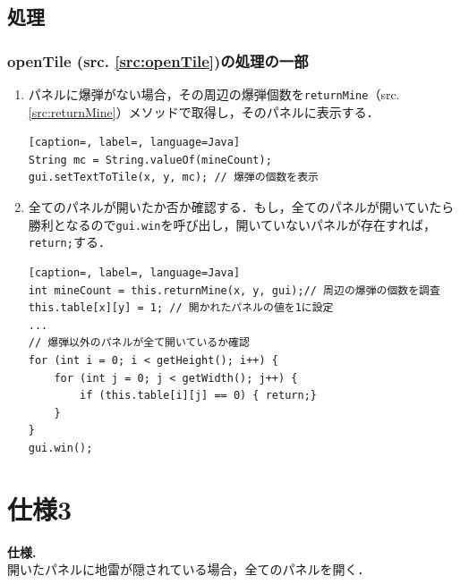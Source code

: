\documentclass[a4j,11pt]{jsarticle}
\newcommand{\srcref}[1]{src. \ref{#1}}
\newcommand{\met}[1]{\ttfamily #1 \normalfont (\srcref{src:#1})の処理}
\begin{document}
\subsection{処理}\label{sec:openTile}
\subsubsection*{\met{openTile}の一部}
\begin{enumerate}
    \item パネルに爆弾がない場合，その周辺の爆弾個数を{\verb|returnMine|}（\srcref{src:returnMine}）メソッドで取得し，そのパネルに表示する．
          \begin{lstlisting}[caption=, label=, language=Java]
String mc = String.valueOf(mineCount);
gui.setTextToTile(x, y, mc); // 爆弾の個数を表示
    \end{lstlisting}
    \item 全てのパネルが開いたか否か確認する．もし，全てのパネルが開いていたら勝利となるので{\verb|gui.win|}を呼び出し，開いていないパネルが存在すれば，{\verb|return;|}する．
          \begin{lstlisting}[caption=, label=, language=Java]
int mineCount = this.returnMine(x, y, gui);// 周辺の爆弾の個数を調査
this.table[x][y] = 1; // 開かれたパネルの値を1に設定
...
// 爆弾以外のパネルが全て開いているか確認
for (int i = 0; i < getHeight(); i++) {
    for (int j = 0; j < getWidth(); j++) {
        if (this.table[i][j] == 0) { return;}
    }
}
gui.win();
\end{lstlisting}
\end{enumerate}
\newpage

\section*{仕様3}
\setcounter{section}{3}
\setcounter{subsection}{0}
\begin{screen}
    \textbf{仕様\thesection.}\\
    開いたパネルに地雷が隠されている場合，全てのパネルを開く．
\end{screen}
\end{document}
